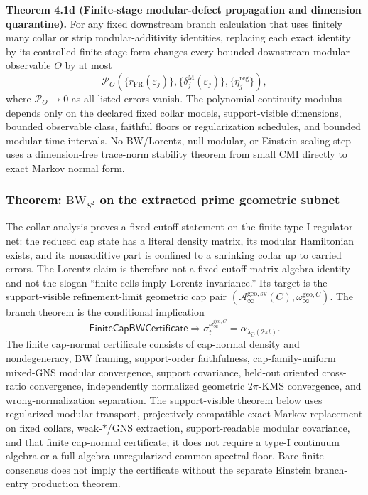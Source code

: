 \textbf{Theorem 4.1d (Finite-stage modular-defect propagation and dimension quarantine).}
For any fixed downstream branch calculation that uses finitely many collar or strip
modular-additivity identities, replacing each exact identity by its controlled finite-stage form
changes every bounded downstream modular observable \(O\) by at most
\[
\mathcal P_O\!\left(
\{r_{\mathrm{FR}}(\varepsilon_j)\},
\{\delta^{\mathrm M}_j(\varepsilon_j)\},
\{\eta^{\mathrm{reg}}_j\}
\right),
\]
where \(\mathcal P_O\to0\) as all listed errors vanish. The polynomial-continuity modulus depends
only on the declared fixed collar models, support-visible dimensions, bounded observable class,
faithful floors or regularization schedules, and bounded modular-time intervals. No BW/Lorentz,
null-modular, or Einstein scaling step uses a dimension-free trace-norm stability theorem from
small CMI directly to exact Markov normal form.
\subsubsection{\texorpdfstring{Theorem: \(\mathrm{BW}_{S^2}\) on the extracted prime geometric subnet}{4.2 Theorem: \textbackslash mathrm\{BW\}\_\{S\^{}2\} on the extracted prime geometric subnet}}\label{42-theorem-mathrmbw_s2-from-markov-locality-symmetry-regularity}

The collar analysis proves a fixed-cutoff statement on the finite type-I regulator net: the reduced cap state has a literal density matrix, its modular Hamiltonian exists, and its nonadditive part is confined to a shrinking collar up to carried errors. The Lorentz claim is therefore not a fixed-cutoff matrix-algebra identity and not the slogan ``finite cells imply Lorentz invariance.'' Its target is the support-visible refinement-limit geometric cap pair \((\mathcal A_\infty^{\mathrm{geo,sv}}(C),\omega_\infty^{\mathrm{geo},C})\). The branch theorem is the conditional implication
\[
\mathsf{FiniteCapBWCertificate}
\Longrightarrow
\sigma_t^{\omega_\infty^{\mathrm{geo},C}}
=
\alpha_{\lambda_{\widehat C}(2\pi t)}.
\]
The finite cap-normal certificate consists of cap-normal density and nondegeneracy, BW framing,
support-order faithfulness, cap-family-uniform mixed-GNS modular convergence, support covariance,
held-out oriented cross-ratio convergence, independently normalized geometric \(2\pi\)-KMS
convergence, and wrong-normalization separation. The support-visible theorem below uses
regularized modular transport, projectively compatible exact-Markov replacement on fixed collars,
weak-\(*\)/GNS extraction, support-readable modular covariance, and that finite cap-normal
certificate; it does not require a type-I continuum algebra or a full-algebra unregularized common
spectral floor. Bare finite consensus does not imply the certificate without the separate
Einstein branch-entry production theorem.

